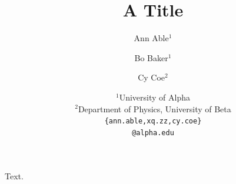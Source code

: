 \documentclass{article}
\title{A Title}
\author{%
  Ann Able$^{1}$ \\
  \and
  Bo Baker$^{1}$ \\
  \and
  Cy Coe$^{2}$ \\
  \and
 {\normalfont $^1$University of Alpha} \\
 {\normalfont $^2$Department of Physics, University of Beta} \\
 \texttt{\{ann.able,xq.zz,cy.coe\}}\\
 \texttt{@alpha.edu}
}
\begin{document}
\maketitle
Text.
\end{document}
